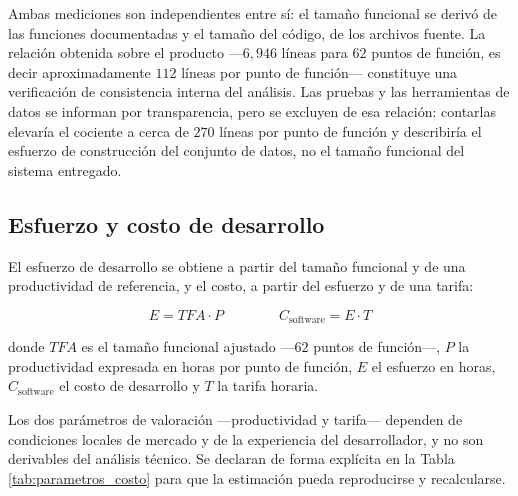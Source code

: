 Ambas mediciones son independientes entre sí: el tamaño funcional se derivó de
las funciones documentadas y el tamaño del código, de los archivos fuente. La
relación obtenida sobre el producto ---$6{,}946$ líneas para $62$ puntos de
función, es decir aproximadamente $112$ líneas por punto de función--- constituye
una verificación de consistencia interna del análisis. Las pruebas y las
herramientas de datos se informan por transparencia, pero se excluyen de esa
relación: contarlas elevaría el cociente a cerca de $270$ líneas por punto de
función y describiría el esfuerzo de construcción del conjunto de datos, no el
tamaño funcional del sistema entregado.

\subsection{Esfuerzo y costo de desarrollo}

El esfuerzo de desarrollo se obtiene a partir del tamaño funcional y de una
productividad de referencia, y el costo, a partir del esfuerzo y de una tarifa:

\begin{equation}
    E = TFA \cdot P \qquad\qquad C_{\text{software}} = E \cdot T
\end{equation}

donde $TFA$ es el tamaño funcional ajustado ---$62$ puntos de función---, $P$ la
productividad expresada en horas por punto de función, $E$ el esfuerzo en horas,
$C_{\text{software}}$ el costo de desarrollo y $T$ la tarifa horaria.

Los dos parámetros de valoración ---productividad y tarifa--- dependen de
condiciones locales de mercado y de la experiencia del desarrollador, y no son
derivables del análisis técnico. Se declaran de forma explícita en la Tabla
\ref{tab:parametros_costo} para que la estimación pueda reproducirse y
recalcularse.

